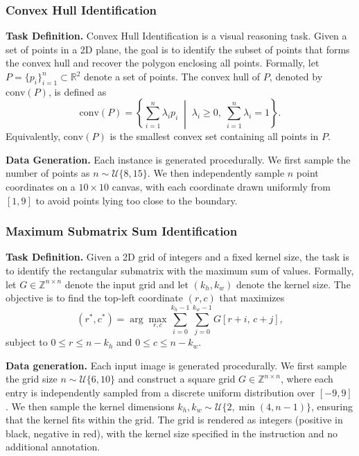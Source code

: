 \documentclass{llmxive}
\begin{document}
\subsubsection{Convex Hull Identification}
\textbf{Task Definition.}
Convex Hull Identification is a visual reasoning task. Given a set of points in
a 2D plane, the goal is to identify the subset of points that forms the convex
hull and recover the polygon enclosing all points. Formally, let
\(P = \{p_i\}_{i=1}^n \subset \mathbb{R}^2\) denote a set of points. The convex
hull of \(P\), denoted by \(\mathrm{conv}(P)\), is defined as
\begin{equation}
\mathrm{conv}(P) =
\left\{
\sum_{i=1}^n \lambda_i p_i \;\middle|\;
\lambda_i \ge 0,\;
\sum_{i=1}^n \lambda_i = 1
\right\}.
\end{equation}
Equivalently, \(\mathrm{conv}(P)\) is the smallest convex set containing all
points in \(P\). 

\textbf{Data Generation.}
Each instance is generated procedurally. We first sample the number of points
as \(n \sim \mathcal{U}\{8,15\}\). We then independently sample \(n\) point
coordinates on a \(10 \times 10\) canvas, with each coordinate drawn uniformly
from \([1,9]\) to avoid points lying too close to the boundary.

\subsubsection{Maximum Submatrix Sum Identification}
\textbf{Task Definition.}
Given a 2D grid of integers and a fixed kernel size, the task is to identify
the rectangular submatrix with the maximum sum of values.
Formally, let \(G \in \mathbb{Z}^{n \times n}\) denote the input grid and let
\((k_h, k_w)\) denote the kernel size. The objective is to find the top-left
coordinate \((r, c)\) that maximizes
\begin{equation}
(r^*, c^*) = \arg\max_{r, c}
\sum_{i=0}^{k_h-1} \sum_{j=0}^{k_w-1} G[r+i,\, c+j],
\end{equation}
subject to \(0 \le r \le n-k_h\) and \(0 \le c \le n-k_w\).

\textbf{Data generation.}
Each input image is generated procedurally. We first sample the grid size
\(n \sim \mathcal{U}\{6,10\}\) and construct a square grid
\(G \in \mathbb{Z}^{n \times n}\), where each entry is independently sampled
from a discrete uniform distribution over \([-9,9]\). We then sample the kernel
dimensions \(k_h, k_w \sim \mathcal{U}\{2, \min(4, n-1)\}\), ensuring that the
kernel fits within the grid. The grid is rendered as integers (positive in black, negative in red), with the
kernel size specified in the instruction and no additional annotation.
\end{document}
